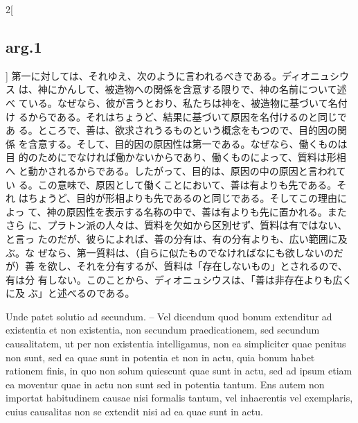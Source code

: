 \documentclass[paper=a4paper,fontsize=10pt,jafontsize=9pt,titlepage]{jlreq}
\begin{document}
\begin{paracol}{2}[\subsection{arg.1}]
第一に対しては、それゆえ、次のように言われるべきである。ディオニュシウス
 は、神にかんして、被造物への関係を含意する限りで、神の名前について述べ
 ている。なぜなら、彼が言うとおり、私たちは神を、被造物に基づいて名付け
 るからである。それはちょうど、結果に基づいて原因を名付けるのと同じであ
 る。ところで、善は、欲求されうるものという概念をもつので、目的因の関係
 を含意する。そして、目的因の原因性は第一である。なぜなら、働くものは目
 的のためにでなければ働かないからであり、働くものによって、質料は形相へ
 と動かされるからである。したがって、目的は、原因の中の原因と言われてい
 る。この意味で、原因として働くことにおいて、善は有よりも先である。それ
 はちょうど、目的が形相よりも先であるのと同じである。そしてこの理由によっ
 て、神の原因性を表示する名称の中で、善は有よりも先に置かれる。またさら
 に、プラトン派の人々は、質料を欠如から区別せず、質料は有ではない、と言っ
 たのだが、彼らによれば、善の分有は、有の分有よりも、広い範囲に及ぶ。な
 ぜなら、第一質料は、（自らに似たものでなければなにも欲しないのだが）善
 を欲し、それを分有するが、質料は「存在しないもの」とされるので、有は分
 有しない。このことから、ディオニュシウスは、「善は非存在よりも広くに及
 ぶ」と述べるのである。

\switchcolumn*

Unde patet solutio ad secundum. -- Vel dicendum quod bonum extenditur ad
 existentia et non existentia, non secundum praedicationem, sed secundum
 causalitatem, ut per non existentia intelligamus, non ea simpliciter
 quae penitus non sunt, sed ea quae sunt in potentia et non in actu,
 quia bonum habet rationem finis, in quo non solum quiescunt quae sunt
 in actu, sed ad ipsum etiam ea moventur quae in actu non sunt sed in
 potentia tantum. Ens autem non importat habitudinem causae nisi
 formalis tantum, vel inhaerentis vel exemplaris, cuius causalitas non
 se extendit nisi ad ea quae sunt in actu.

\switchcolumn


\end{paracol}
\end{document}

